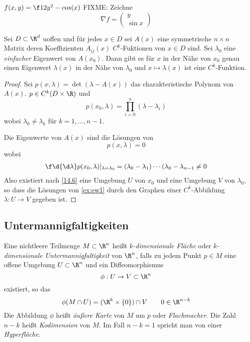 \documentclass[a4paper,10pt]{scrartcl}
\begin{document}
\begin{ex*}[Pendel!]
	$f(x,y) = \f 12y^2 -cos(x)$
	FIXME: Zeichne
	\[
		\nabla f = \begin{pmatrix}y\\ \sin x\end{pmatrix}
	\]
\end{ex*}

\begin{ex*}
	Sei $D\subset \R^d$ uoffen und für jedes $x\in D$ sei $A(x)$ eine symmetrische $n\times n$ Matrix deren Koeffizienten $A_{ij}(x)$ $C^k$-Fuktionen von $x\in D$ sind.
	Sei $\lambda_0$ eine \emph{einfacher} Eigenwert von $A(x_0)$.
	Dann gibt es für $x$ in der Nähe von $x_0$ genau einen Eigenwert $\lambda(x)$ in der Nähe von $\lambda_0$ und $x\mapsto \lambda(x)$ ist eine $C^k$-Funktion.
	\begin{proof}
		Sei $p(x,\lambda) = \det(\lambda-A(x))$ das charakteristische Polynom von $A(x)$.
		$p\in C^k(D\times \R)$ und
		\[
			p(x_0,\lambda) = \prod_{i=0}^n(\lambda-\lambda_i)
		\]
		wobei $\lambda_0\neq \lambda_k$ für $k=1,\dotsc,n-1$.

		Die Eigenwerte von $A(x)$ sind die Lösungen von
		\begin{equation}
			\label{ex:ew1}
			p(x,\lambda) = 0
		\end{equation}
		wobei
		\begin{align*}
			\f \d{\d\lambda}p(x_0,\lambda)|_{\lambda=\lambda_0} = (\lambda_0-\lambda_1)\dotsb (\lambda_0-\lambda_{n-1} \neq 0
		\end{align*}
		Also existiert nach \ref{14.6} eine Umgebung $U$ von $x_0$ und eine Umgebung $V$ von $\lambda_0$, so dass die Lösungen von \eqref{ex:ew1} durch den Graphen einer $C^k$-Abbildung $\lambda:U\to V$ gegeben ist.
	\end{proof}
\end{ex*}


\subsection{Untermannigfaltigkeiten}


Eine nichtleere Teilmenge $M\subset \R^n$ heißt \emph{$k$-dimensionale Fläche} oder \emph{$k$-dimensionale Untermannigfaltigkeit} von $\R^n$, falls zu jedem Punkt $p\in M$ eine offene Umgebung $U\subset \R^n$ und ein Diffeomorphismus
\[
	\phi:U\to V\subset \R^n
\]
existiert, so das
\[
	\phi(M\cap U) = (\R^k\times\{0\})\cap V \qquad 0\in \R^{n-k}
\]
Die Abbildung $\phi$ heißt \emph{äußere Karte} von $M$ um $p$ oder \emph{Flachmacher}.
Die Zahl $n-k$ heißt \emph{Kodimension} von $M$.
Im Fall $n-k=1$ spricht man von einer \emph{Hyperfläche}.
\end{document}
